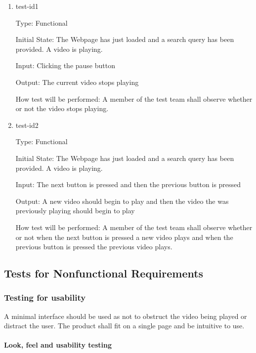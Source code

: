 \documentclass[12pt, titlepage]{article}
\begin{document}
\begin{enumerate}

\item{test-id1\\}

Type: Functional
					
Initial State: The Webpage has just loaded and a search query has been provided.  A video is playing.
					
Input: Clicking the pause button
					
Output: The current video stops playing
					
How test will be performed: \color{red}A member of the test team shall observe whether or not the video stops playing. \color{black}
					
\item{test-id2\\}

Type: Functional
					
Initial State: The Webpage has just loaded and a search query has been provided.  A video is playing.
					
Input: The next button is pressed and then the previous button is pressed
					
Output: A new video should begin to play and then the video the was previously playing should begin to play
					
How test will be performed: \color{red}A member of the test team shall observe whether or not when the next button is pressed a new video plays and when the previous button is pressed the previous video plays. \color{black}

\end{enumerate}

\subsection{Tests for Nonfunctional Requirements}

\subsubsection{Testing for usability}

A minimal interface should be used as not to obstruct the video being played or distract the user.  The product shall fit on a single page and be intuitive to use.
		
\paragraph{Look, feel and usability testing}
\end{document}
